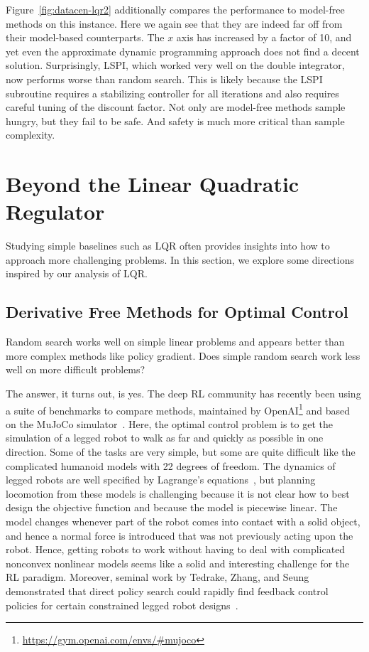 \documentclass[11pt]{article}
\newcommand{\fig}[1]{Figure~\ref{fig:#1}}
\numberwithin{equation}{section}
\begin{document}
\fig{datacen-lqr2} additionally compares the performance to model-free methods on this instance. Here we again see that they are indeed far off from their model-based counterparts. The $x$ axis has increased by a factor of 10, and yet even the approximate dynamic programming approach does not find a decent solution. Surprisingly, LSPI, which worked very well on the double integrator, now  performs worse than random search. This is likely because the LSPI subroutine requires a stabilizing controller for all iterations and also requires careful tuning of the discount factor. Not only are model-free methods sample hungry, but they fail to be safe. And safety is much more critical than sample complexity.

\section{Beyond the Linear Quadratic Regulator}

Studying simple baselines such as LQR often provides insights into how to approach more challenging problems. In this section, we explore some directions inspired by our analysis of LQR.

\subsection{Derivative Free Methods for Optimal Control}

Random search works well on simple linear problems and appears better than more complex methods like policy gradient. Does simple random search work less well on more difficult problems?

The answer, it turns out, is yes. The deep RL community has recently been using a suite of benchmarks to compare methods, maintained by OpenAI\footnote{\url{https://gym.openai.com/envs/\#mujoco}} and based on the MuJoCo simulator~\cite{todorov2012mujoco}. Here, the optimal control problem is to get the simulation of a legged robot to walk as far and quickly as possible in one direction. Some of the tasks are very simple, but some are quite difficult like the complicated humanoid models with 22 degrees of freedom. The dynamics of legged robots are well specified by Lagrange's equations~\cite{murray2017mathematical}, but planning locomotion from these models is challenging because it is not clear how to best design the objective function and because the model is piecewise linear. The model changes whenever part of the robot comes into contact with a solid object, and hence a normal force is introduced that was not previously acting upon the robot. Hence, getting robots to work without having to deal with complicated nonconvex nonlinear models seems like a solid and interesting challenge for the RL paradigm. Moreover, seminal work by Tedrake, Zhang, and Seung demonstrated that direct policy search could rapidly find feedback control policies for certain constrained legged robot designs~\cite{tedrake2004stochastic}.
\end{document}
